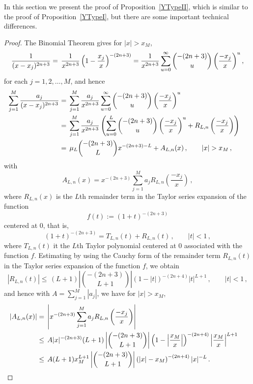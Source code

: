 \documentclass{article}
\theoremstyle{remark}
\numberwithin{equation}{section}
\begin{document}
In this section we present the proof of Proposition~\ref{YTypeII}, which is similar to the proof of Proposition~\ref{YTypeI}, but there are some important technical differences. 

\begin{proof}
The Binomial Theorem gives for $|x| > x_M$,
\begin{equation} \notag 
\frac{1}{(x-x_j)^{2n+3}} = \, \frac{1}{x^{2n+3}}\left( 1 - \frac{x_j}{x} \right)^{-(2n+3)} 
= \frac{1}{x^{2n+3}} \sum_{u=0}^\infty{\binom{-(2n+3)}{u} \left( \frac{-x_j}{x} \right)^u}\,, 
\end{equation}
for each $j=1,2,\ldots,M$, and hence
\begin{equation}\label{F10} 
\begin{split} 
\sum_{j=1}^M{\frac{a_j}{(x-x_j)^{2n+3}}} & = \, \sum_{j=1}^M \frac{a_j}{x^{2n+3}} \sum_{u=0}^\infty{\binom{-(2n+3)}{u} \left( \frac{-x_j}{x} \right)^u} \cr
& = \, \sum_{j=1}^M \frac{a_j}{x^{2n+3}} \left( \sum_{u=0}^L{\binom{-(2n+3)}{u} \left( \frac{-x_j}{x} \right)^u} + R_{L,n}\left( \frac{-x_j}{x} \right) \right) \cr
& = \, \mu_L \binom{-(2n+3)}{L}x^{-(2n+3)-L} + A_{L,n}(x)\,, \qquad |x| > x_M\,, \cr 
\end{split} 
\end{equation}
with
$$A_{L,n}(x) = x^{-(2n+3)}\sum_{j=1}^M{a_j R_{L,n}\left( \frac{-x_j}{x} \right)}\,,$$
where $R_{L,n}(x)$ is the $L$th remainder term in the Taylor series expansion of the function 
$$f(t) := (1+t)^{-(2n+3)}$$ 
centered at $0$, that is, 
$$(1+t)^{-(2n+3)} = T_{L,n}(t) + R_{L,n}(t)\,, \qquad |t| < 1\,,$$
where $T_{L,n}(t)$ it the $L$th Taylor polynomial centered at $0$ associated with the function $f$. 
Estimating by using the Cauchy form of the remainder term $R_{L,n}(t)$ in the Taylor series expansion of the function $f$, we obtain
$$|R_{L,n}(t)| \leq \, (L+1) \left| \binom{-(2n+3)}{L+1} \right| (1-|t|)^{-(2n+4)}|t|^{L+1}\,, \qquad |t| < 1\,,$$ 
and hence with $A = \sum_{j=1}^M{|a_j|}$, we have for $|x| > x_M$,
\begin{equation}\label{F11}
\begin{split} 
|A_{L,n}(x)| & = \, \left| x^{-(2n+3)}\sum_{j=1}^M{a_jR_{L,n}\left( \frac{-x_j}{x} \right)} \right| \cr 
& \leq \, A|x|^{-(2n+3)}(L+1)\left| \binom{-(2n+3)}{L+1} \right| \left(1 - \left| \frac{x_M}{x} \right| \right)^{-(2n+4)} \left| \frac{x_M}{x} \right|^{L+1} \, \cr
& \leq \, A(L+1)x_M^{L+1} \left| \binom{-(2n+3)}{L+1} \right| \left( |x| - x_M \right)^{-(2n+4)} |x|^{-L}\, . \cr
\end{split} 
\end{equation}

\end{proof}
\end{document}

